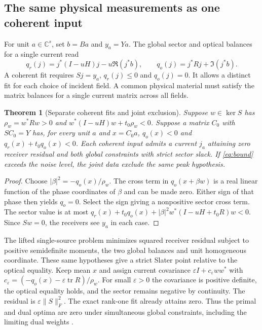 \documentclass[anonymous,12pt]{iopjournal}
\newtheorem{theorem}{Theorem}[section]
\newcommand{\C}{\mathbb C}\newcommand{\R}{\mathbb R}
\newcommand{\tr}{\operatorname{tr}}\newcommand{\diag}{\operatorname{diag}}
\numberwithin{equation}{section}
\begin{document}
\subsection{The same physical measurements as one coherent input}
For unit $a\in\C^s$, set $b=Ba$ and $y_a=Ya$. The global sector and optical balances for a single current read
\[
 q_r(j)=j^*(I-uH)j-u\Re(j^*b),\qquad
 q_o(j)=j^*Rj+\Im(j^*b).
\]
A coherent fit requires $Sj=y_a$, $q_r(j)\le0$ and $q_o(j)=0$. It allows a distinct fit for each choice of incident field. A common physical material must satisfy the matrix balances for a single current matrix across all fields.

\begin{theorem}[Separate coherent fits and joint exclusion]\label{th:two}
Suppose $w\in\ker S$ has $\rho_w=w^*Rw>0$ and
$w^*(I-uH)w+t_0\rho_w<0$. Suppose a matrix $C_0$ with $SC_0=Y$ has, for every unit $a$ and $x=C_0a$,
$q_o(x)<0$ and $q_r(x)+t_0q_o(x)<0$.
Each coherent input admits a current $j_a$ attaining zero receiver residual and both global constraints with strict sector slack. If \eqref{eq:bound} exceeds the noise level, the joint data exclude the same peak hypothesis.
\end{theorem}
\begin{proof}
Choose $|\beta|^2=-q_o(x)/\rho_w$. The cross term in $q_o(x+\beta w)$ is a real linear function of the phase coordinates of $\beta$ and can be made zero. Either sign of that phase then yields $q_o=0$. Select the sign giving a nonpositive sector cross term. The sector value is at most
$q_r(x)+t_0 q_o(x)+|\beta|^2w^*(I-uH+t_0R)w<0$. Since $Sw=0$, the receivers see $y_a$ in each case.
\end{proof}
The lifted single-source problem minimizes squared receiver residual subject to positive semidefinite moments, the two global balances and unit homogeneous coordinate. These same hypotheses give a strict Slater point relative to the optical equality. Keep mean $x$ and assign current covariance
$\varepsilon I+c_\varepsilon ww^*$ with
$c_\varepsilon=(-q_o(x)-\varepsilon\tr R)/\rho_w$.
For small $\varepsilon>0$ the covariance is positive definite, the optical equality holds, and the sector remains negative by continuity. The residual is $\varepsilon\|S\|_F^2$. The exact rank-one fit already attains zero. Thus the primal and dual optima are zero under simultaneous global constraints, including the limiting dual weights \cite{boyd,beck}.
\end{document}
